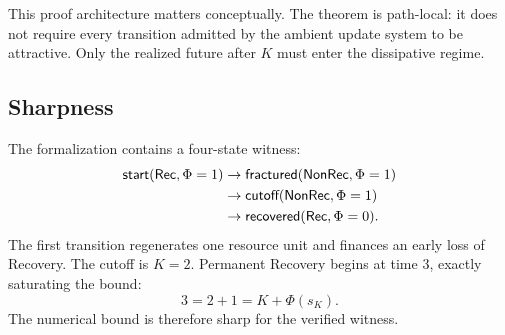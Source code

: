 This proof architecture matters conceptually. The theorem is path-local: it does not require every transition admitted by the ambient update system to be attractive. Only the realized future after $K$ must enter the dissipative regime.

\subsection{Sharpness}

The formalization contains a four-state witness:
\[
\begin{aligned}
\textsf{start}(\mathsf{Rec},\Phi=1)
&\to \textsf{fractured}(\mathsf{NonRec},\Phi=1)\\
&\to \textsf{cutoff}(\mathsf{NonRec},\Phi=1)\\
&\to \textsf{recovered}(\mathsf{Rec},\Phi=0).
\end{aligned}
\]
The first transition regenerates one resource unit and finances an early loss of Recovery. The cutoff is $K=2$. Permanent Recovery begins at time $3$, exactly saturating the bound:
\[
3=2+1=K+\Phi(s_K).
\]
The numerical bound is therefore sharp for the verified witness.

